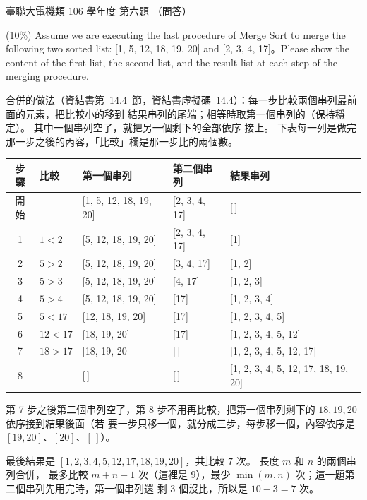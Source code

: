 \begin{pastexam}[label={px:ust-106-ee-ds-06}]{臺聯大電機類 106 學年度 第六題}
（問答）

(10\%) Assume we are executing the last procedure of Merge Sort to merge the following two sorted list:
[1, 5, 12, 18, 19, 20] and [2, 3, 4, 17]。Please show the content of the first list, the second list, and
the result list at each step of the merging procedure.
\end{pastexam}

\begin{pastsoln}
合併的做法（資結書第~14.4~節，資結書虛擬碼~14.4）：每一步比較兩個串列最前面的元素，把比較小的移到
結果串列的尾端；相等時取第一個串列的（保持穩定）。 其中一個串列空了，就把另一個剩下的全部依序
接上。 下表每一列是做完那一步之後的內容，「比較」欄是那一步比的兩個數。

\begin{center}
\begin{tabular}{cllll}
\toprule
步驟 & 比較 & 第一個串列 & 第二個串列 & 結果串列 \\
\midrule
開始 & & [1, 5, 12, 18, 19, 20] & [2, 3, 4, 17] & [\,] \\
1 & $1 < 2$ & [5, 12, 18, 19, 20] & [2, 3, 4, 17] & [1] \\
2 & $5 > 2$ & [5, 12, 18, 19, 20] & [3, 4, 17] & [1, 2] \\
3 & $5 > 3$ & [5, 12, 18, 19, 20] & [4, 17] & [1, 2, 3] \\
4 & $5 > 4$ & [5, 12, 18, 19, 20] & [17] & [1, 2, 3, 4] \\
5 & $5 < 17$ & [12, 18, 19, 20] & [17] & [1, 2, 3, 4, 5] \\
6 & $12 < 17$ & [18, 19, 20] & [17] & [1, 2, 3, 4, 5, 12] \\
7 & $18 > 17$ & [18, 19, 20] & [\,] & [1, 2, 3, 4, 5, 12, 17] \\
8 & & [\,] & [\,] & [1, 2, 3, 4, 5, 12, 17, 18, 19, 20] \\
\bottomrule
\end{tabular}
\end{center}

第 7 步之後第二個串列空了，第 8 步不用再比較，把第一個串列剩下的 $18, 19, 20$ 依序接到結果後面（若
要一步只移一個，就分成三步，每步移一個，內容依序是 $[19, 20]$、$[20]$、$[\,]$）。

最後結果是 $[1, 2, 3, 4, 5, 12, 17, 18, 19, 20]$，共比較 $7$ 次。 長度 $m$ 和 $n$ 的兩個串列合併，
最多比較 $m + n - 1$ 次（這裡是 $9$），最少 $\min(m, n)$ 次；這一題第二個串列先用完時，第一個串列還
剩 $3$ 個沒比，所以是 $10 - 3 = 7$ 次。
\end{pastsoln}
